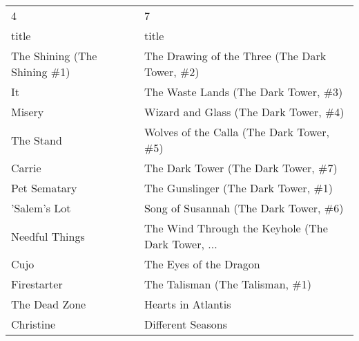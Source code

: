 \begin{tabular}{ll}
\toprule
                            4 &                                                  7 \\
                        title &                                              title \\
\midrule
 The Shining (The Shining \#1) &      The Drawing of the Three (The Dark Tower, \#2) \\
                           It &               The Waste Lands (The Dark Tower, \#3) \\
                       Misery &              Wizard and Glass (The Dark Tower, \#4) \\
                    The Stand &           Wolves of the Calla (The Dark Tower, \#5) \\
                       Carrie &                The Dark Tower (The Dark Tower, \#7) \\
                 Pet Sematary &                The Gunslinger (The Dark Tower, \#1) \\
                 'Salem's Lot &              Song of Susannah (The Dark Tower, \#6) \\
               Needful Things &  The Wind Through the Keyhole (The Dark Tower, ... \\
                         Cujo &                             The Eyes of the Dragon \\
                  Firestarter &                    The Talisman (The Talisman, \#1) \\
                The Dead Zone &                                 Hearts in Atlantis \\
                    Christine &                                  Different Seasons \\
\bottomrule
\end{tabular}
